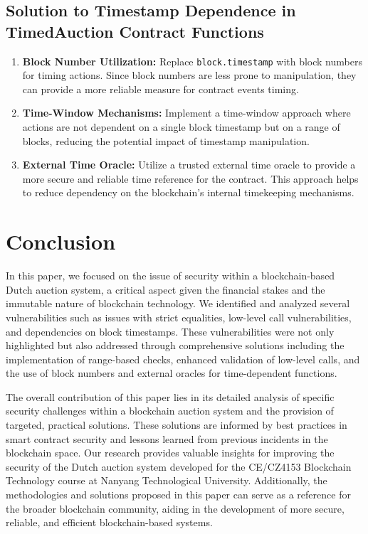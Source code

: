 \documentclass[conference]{IEEEtran}
\begin{document}
\subsection{Solution to Timestamp Dependence in TimedAuction Contract Functions}
\begin{enumerate}
    \item \textbf{Block Number Utilization:} Replace \texttt{block.timestamp} with block numbers for timing actions. Since block numbers are less prone to manipulation, they can provide a more reliable measure for contract events timing.
    \item \textbf{Time-Window Mechanisms:} Implement a time-window approach where actions are not dependent on a single block timestamp but on a range of blocks, reducing the potential impact of timestamp manipulation.
    \item \textbf{External Time Oracle:} Utilize a trusted external time oracle to provide a more secure and reliable time reference for the contract. This approach helps to reduce dependency on the blockchain's internal timekeeping mechanisms.
\end{enumerate}


\section{Conclusion}

In this paper, we focused on the issue of security within a blockchain-based Dutch auction system, a critical aspect given the financial stakes and the immutable nature of blockchain technology. We identified and analyzed several vulnerabilities such as  issues with strict equalities, low-level call vulnerabilities, and dependencies on block timestamps. These vulnerabilities were not only highlighted but also addressed through comprehensive solutions including the implementation of  range-based checks, enhanced validation of low-level calls, and the use of block numbers and external oracles for time-dependent functions.

The overall contribution of this paper lies in its detailed analysis of specific security challenges within a blockchain auction system and the provision of targeted, practical solutions. These solutions are informed by best practices in smart contract security and lessons learned from previous incidents in the blockchain space. Our research provides valuable insights for improving the security of the Dutch auction system developed for the CE/CZ4153 Blockchain Technology course at Nanyang Technological University. Additionally, the methodologies and solutions proposed in this paper can serve as a reference for the broader blockchain community, aiding in the development of more secure, reliable, and efficient blockchain-based systems.


 

\end{document}
